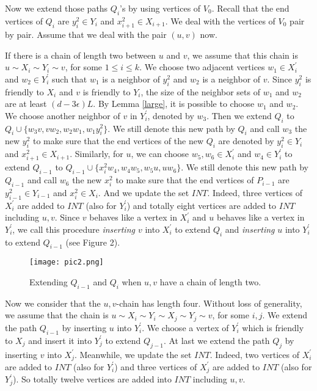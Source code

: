 \documentclass[11pt]{article}
\begin{document}
Now we extend those paths $Q_i$'s by using vertices of $V_0$. Recall that the end vertices of $Q_i$ are $y_i^2\in Y_i$ and $x_{i+1}^2\in X_{i+1}$. We deal with the vertices of $V_0$ pair by pair. Assume that we deal with the pair $(u,v)$ now.

If there is a chain of length two between $u$ and $v$, we assume that this chain is $u\sim X_i\sim Y_i\sim v$, for some $1\leq i\leq k$. We choose two adjacent vertices $w_1\in X_i^{'}$ and $w_2\in Y_i^{'}$ such that $w_1$ is a neighbor of $y_i^2$ and $w_2$ is a neighbor of $v$. Since $y_i^2$ is friendly to $X_i$ and $v$ is friendly to $Y_i$, the size of the neighbor sets of $w_1$ and $w_2$ are at least $(d-3\epsilon )L$. By Lemma \ref{large}, it is possible to choose $w_1$ and $w_2$. We choose another neighbor of $v$ in $Y_i^{'}$, denoted by $w_3$. Then we extend $Q_i$ to $Q_i\cup \{w_3v,vw_2,w_2w_1,w_1y_i^2\}$. We still denote this new path by $Q_i$ and call $w_3$ the new $y_i^2$ to make sure that the end vertices of the new $Q_i$ are denoted by $y_i^2\in Y_i$ and $x_{i+1}^2\in X_{i+1}$. Similarly, for $u$, we can choose $w_5, w_6\in X_i^{'}$ and $w_4\in Y_i^{'}$ to extend $Q_{i-1}$ to $Q_{i-1}\cup \{x_i^2w_4,w_4w_5,w_5u,uw_6\}$. We still denote this new path by $Q_{i-1}$ and call $w_6$ the new $x_i^2$ to make sure that the end vertices of $P_{i-1}$ are  $y_{i-1}^2\in Y_{i-1}$ and $x_i^2\in X_{i}$. And we update the set $INT$. Indeed, three vertices of $X_i^{'}$ are added to $INT$ (also for $Y_i^{'}$) and totally eight vertices are added to $INT$ including $u,v$. Since $v$ behaves like a vertex in $X_i^{'}$ and $u$ behaves like a vertex in $Y_i^{'}$, we call this procedure {\em inserting $v$} into $X_i^{'}$ to extend $Q_i$ and {\em inserting} $u$ into $Y_i^{'}$ to extend $Q_{i-1}$ (see Figure 2).

\begin{figure}[htbp]
\centering
\texttt{[image: pic2.png]}
\caption{Extending $Q_{i-1}$ and $Q_i$ when $u,v$ have a chain of length two.}
\end{figure}


Now we consider that the $u,v$-chain has length four. Without loss of generality, we assume that the chain is $u\sim X_i\sim Y_i\sim X_j\sim Y_j\sim v$, for some $i,j$. We extend the path $Q_{i-1}$ by inserting $u$ into $Y_i^{'}$. We choose a vertex of $Y_i^{'}$ which is friendly to $X_j$ and insert it into $Y_j^{'}$ to extend $Q_{j-1}$. At last we extend the path $Q_{j}$ by inserting $v$ into $X_{j}^{'}$. Meanwhile, we update the set $INT$. Indeed, two vertices of $X_i^{'}$ are added to $INT$ (also for $Y_i^{'}$) and three vertices of $X_j^{'}$ are added to $INT$ (also for $Y_j^{'}$). So totally twelve vertices are added into $INT$ including $u,v$.
\end{document}
